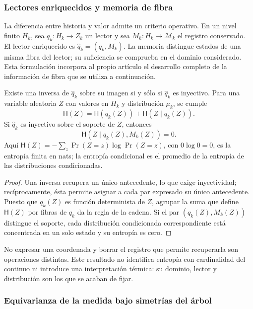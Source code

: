 \subsubsection{Lectores enriquecidos y memoria de fibra}
\label{act21:sec:ch-memoria-fibra}

La diferencia entre historia y valor admite un criterio operativo. En un
nivel finito \(H_k\), sea \(q_k:H_k\to Z_k\) un lector y sea
\(M_k:H_k\to\mathcal M_k\) el registro conservado. El lector enriquecido
es \(\widehat q_k=(q_k,M_k)\). La memoria distingue estados de una misma
fibra del lector; su suficiencia se comprueba en el dominio considerado.
Esta formulación incorpora al propio artículo el desarrollo completo de la
información de fibra que se utiliza a continuación.

\begin{proposition}
\label{act21:prop:ch-recuperabilidad-fibra}
Existe una inversa de \(\widehat q_k\) sobre su imagen si y sólo si
\(\widehat q_k\) es inyectivo. Para una variable aleatoria \(Z\) con
valores en \(H_k\) y distribución \(\mu_k\), se cumple
\[
 \mathsf H(Z)=\mathsf H(q_k(Z))+\mathsf H(Z\mid q_k(Z)).
\]
Si \(\widehat q_k\) es inyectivo sobre el soporte de \(Z\), entonces
\[
 \mathsf H(Z\mid q_k(Z),M_k(Z))=0.
\]
Aquí \(\mathsf H(Z)=-\sum_z\Pr(Z=z)\log\Pr(Z=z)\), con
\(0\log0=0\), es la entropía finita en nats; la entropía condicional es
el promedio de la entropía de las distribuciones condicionadas.
\end{proposition}

\begin{proof}
Una inversa recupera un único antecedente, lo que exige inyectividad;
recíprocamente, ésta permite asignar a cada par expresado su único
antecedente. Puesto que \(q_k(Z)\) es función determinista de \(Z\),
agrupar la suma que define \(\mathsf H(Z)\) por fibras de \(q_k\) da la
regla de la cadena. Si el par \((q_k(Z),M_k(Z))\) distingue el soporte,
cada distribución condicionada correspondiente está concentrada en un solo
estado y su entropía es cero.
\end{proof}

No expresar una coordenada y borrar el registro que permite recuperarla son
operaciones distintas. Este resultado no identifica entropía con cardinalidad
del continuo ni introduce una interpretación térmica: su dominio, lector y
distribución son los que se acaban de fijar.

\subsubsection{Equivarianza de la medida bajo simetrías del árbol}
\label{act21:sec:ch-naturalidad-medida}

